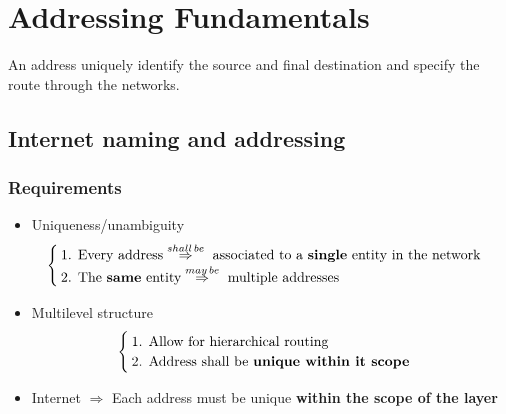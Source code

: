 \chapter{Addressing Fundamentals}
An address uniquely identify the source and final destination and specify the route through the networks.
\section{Internet naming and addressing}
\subsection{Requirements}
\begin{itemize}
\item Uniqueness/unambiguity
\begin{equation}
\begin{cases}
\text{1. Every address} \stackrel{shall\, be}{\Rightarrow} \text{ associated to a } \textbf{single} \text{ entity in the network}\\
\text{2. The \textbf{same} entity} \stackrel{may\, be}{\Rightarrow} \text{ multiple addresses}
\end{cases}
\end{equation}
\item Multilevel structure
\begin{equation}
\begin{cases}
\text{1. Allow for hierarchical routing}\\
\text{2. Address shall be \textbf{unique within it scope}}
\end{cases}
\end{equation}
\item Internet $\Rightarrow$ Each address must be unique \textbf{within the scope of the layer}
\end{itemize}

